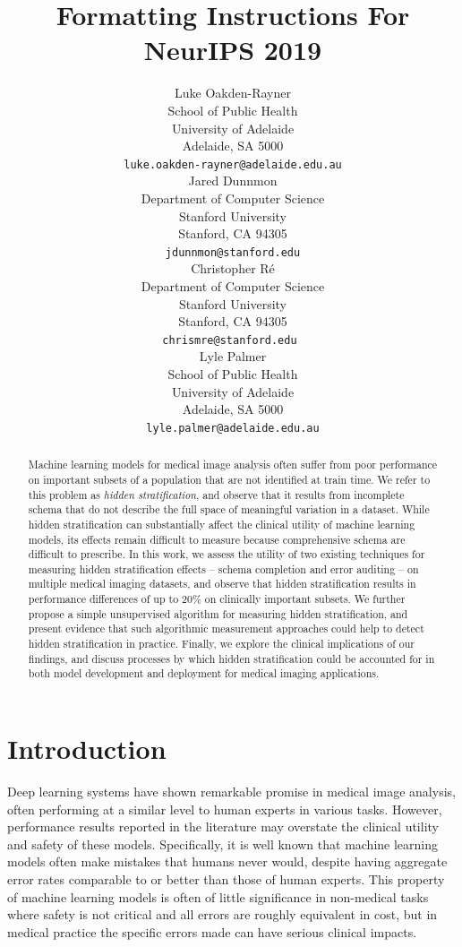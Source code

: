 \documentclass{article}
\title{Formatting Instructions For NeurIPS 2019}
\author{%
  Luke Oakden-Rayner\\
  School of Public Health\\
  University of Adelaide\\
  Adelaide, SA 5000 \\
  \texttt{luke.oakden-rayner@adelaide.edu.au} \\
  \And
    Jared Dunnmon\\
  Department of Computer Science\\
  Stanford University\\
  Stanford, CA 94305 \\
  \texttt{jdunnmon@stanford.edu} \\
  \And
  Christopher R\'{e}\\
  Department of Computer Science\\
  Stanford University\\
  Stanford, CA 94305 \\
  \texttt{chrismre@stanford.edu } \\
  \And
    Lyle Palmer\\
  School of Public Health\\
  University of Adelaide\\
  Adelaide, SA 5000 \\
  \texttt{lyle.palmer@adelaide.edu.au} }
\begin{document}
\maketitle

\begin{abstract}
Machine learning models for medical image analysis often suffer from poor performance on important subsets of a population that are not identified at train time.  
We refer to this problem as \textit{hidden stratification}, and observe that it results from incomplete schema that do not describe the full space of meaningful variation in a dataset.  
While hidden stratification can substantially affect the clinical utility of machine learning models, its effects remain difficult to measure because comprehensive schema are difficult to prescribe.
In this work, we assess the utility of two existing techniques for measuring hidden stratification effects -- schema completion and error auditing -- on multiple medical imaging datasets, and observe that hidden stratification results in performance differences of up to 20\% on clinically important subsets.
We further propose a simple unsupervised algorithm for measuring hidden stratification, and present evidence that such algorithmic measurement approaches could help to detect hidden stratification in practice.
Finally, we explore the clinical implications of our findings, and discuss processes by which hidden stratification could be accounted for in both model development and deployment for medical imaging applications. 
\end{abstract}

\section{Introduction}

Deep learning systems have shown remarkable promise in medical image analysis, often performing at a similar level to human experts in various tasks. 
 However, performance results reported in the literature may overstate the clinical utility and safety of these models.  
 Specifically, it is well known that machine learning models often make mistakes that humans never would, despite having aggregate error rates comparable to or better than those of human experts. 
 This property of machine learning models is often of little significance in non-medical tasks where safety is not critical and all errors are roughly equivalent in cost, but in medical practice the specific errors made can have serious clinical impacts. 
 
\end{document}

